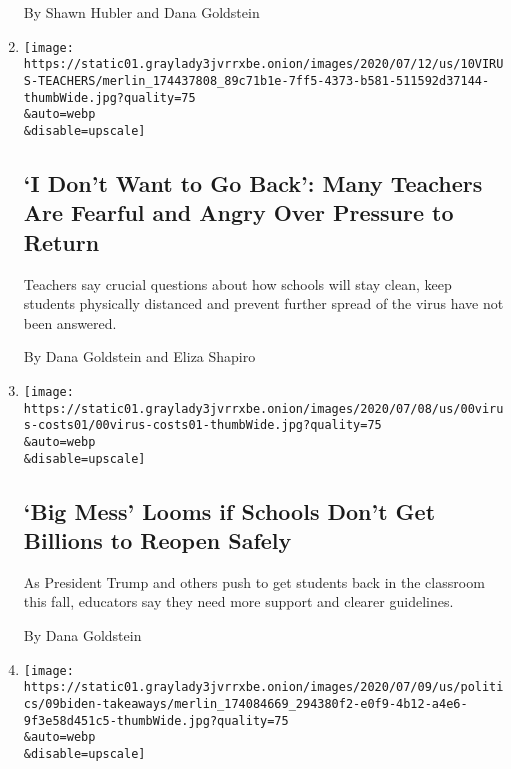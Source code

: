 \begin{enumerate}
  By Shawn Hubler and Dana Goldstein
\item
  \href{/2020/07/11/us/virus-teachers-classrooms.html}{}

  \texttt{[image: https://static01.graylady3jvrrxbe.onion/images/2020/07/12/us/10VIRUS-TEACHERS/merlin\_174437808\_89c71b1e-7ff5-4373-b581-511592d37144-thumbWide.jpg?quality=75\\\&auto=webp\\\&disable=upscale]}

  \hypertarget{i-dont-want-to-go-back-many-teachers-are-fearful-and-angry-over-pressure-to-return}{%
  \subsection{`I Don't Want to Go Back': Many Teachers Are Fearful and
  Angry Over Pressure to
  Return}\label{i-dont-want-to-go-back-many-teachers-are-fearful-and-angry-over-pressure-to-return}}

  Teachers say crucial questions about how schools will stay clean, keep
  students physically distanced and prevent further spread of the virus
  have not been answered.

  By Dana Goldstein and Eliza Shapiro
\item
  \href{/2020/07/09/us/schools-reopening-trump.html}{}

  \texttt{[image: https://static01.graylady3jvrrxbe.onion/images/2020/07/08/us/00virus-costs01/00virus-costs01-thumbWide.jpg?quality=75\\\&auto=webp\\\&disable=upscale]}

  \hypertarget{big-mess-looms-if-schools-dont-get-billions-to-reopen-safely}{%
  \subsection{`Big Mess' Looms if Schools Don't Get Billions to Reopen
  Safely}\label{big-mess-looms-if-schools-dont-get-billions-to-reopen-safely}}

  As President Trump and others push to get students back in the
  classroom this fall, educators say they need more support and clearer
  guidelines.

  By Dana Goldstein
\item
  \href{/2020/07/09/us/politics/biden-sanders-task-force.html}{}

  \texttt{[image: https://static01.graylady3jvrrxbe.onion/images/2020/07/09/us/politics/09biden-takeaways/merlin\_174084669\_294380f2-e0f9-4b12-a4e6-9f3e58d451c5-thumbWide.jpg?quality=75\\\&auto=webp\\\&disable=upscale]}

  \hypertarget{6-takeaways-from-the-biden-sanders-joint-task-force-proposals}{%
}
\end{enumerate}
